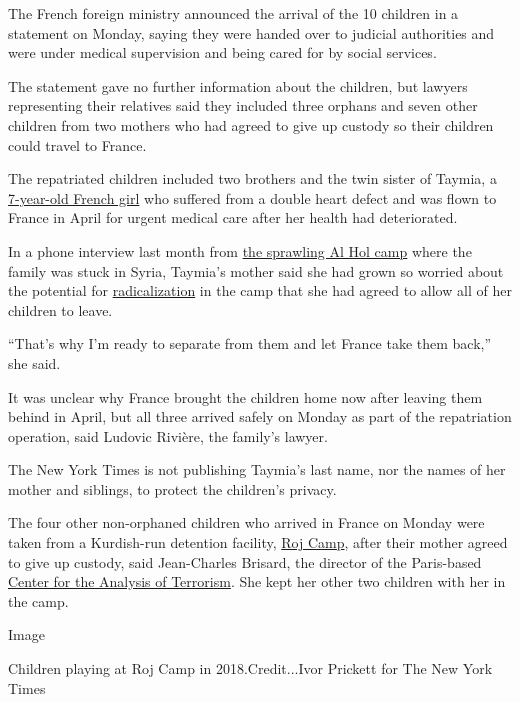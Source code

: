 The French foreign ministry announced the arrival of the 10 children in
a statement on Monday, saying they were handed over to judicial
authorities and were under medical supervision and being cared for by
social services.

The statement gave no further information about the children, but
lawyers representing their relatives said they included three orphans
and seven other children from two mothers who had agreed to give up
custody so their children could travel to France.

The repatriated children included two brothers and the twin sister of
Taymia, a
\href{https://www.nytimes3xbfgragh.onion/2020/05/31/world/middleeast/isis-children-syria-camps.html}{7-year-old
French girl} who suffered from a double heart defect and was flown to
France in April for urgent medical care after her health had
deteriorated.

In a phone interview last month from
\href{https://www.nytimes3xbfgragh.onion/2019/03/29/world/middleeast/isis-syria-women-children.html}{the
sprawling Al Hol camp} where the family was stuck in Syria, Taymia's
mother said she had grown so worried about the potential for
\href{https://www.nytimes3xbfgragh.onion/2019/09/03/world/middleeast/isis-alhol-camp-syria.html}{radicalization}
in the camp that she had agreed to allow all of her children to leave.

``That's why I'm ready to separate from them and let France take them
back,'' she said.

It was unclear why France brought the children home now after leaving
them behind in April, but all three arrived safely on Monday as part of
the repatriation operation, said Ludovic Rivière, the family's lawyer.

The New York Times is not publishing Taymia's last name, nor the names
of her mother and siblings, to protect the children's privacy.

The four other non-orphaned children who arrived in France on Monday
were taken from a Kurdish-run detention facility,
\href{https://www.nytimes3xbfgragh.onion/2018/07/04/world/middleeast/islamic-state-families-syria.html}{Roj
Camp}, after their mother agreed to give up custody, said Jean-Charles
Brisard, the director of the Paris-based
\href{http://cat-int.org/?lang=en}{Center for the Analysis of
Terrorism}. She kept her other two children with her in the camp.

Image

Children playing at Roj Camp in 2018.Credit...Ivor Prickett for The New
York Times

